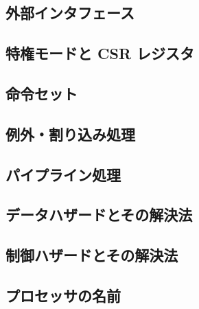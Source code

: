 \documentclass[../main.tex]{subfiles}
\begin{document}
  \subsection{外部インタフェース}
  

  \subsection{特権モードと CSR レジスタ}
  

  \subsection{命令セット}
  

  \subsection{例外・割り込み処理}
  

  \subsection{パイプライン処理}
  

  \subsection{データハザードとその解決法}
  

  \subsection{制御ハザードとその解決法}
  

  \subsection{プロセッサの名前}
\end{document}
